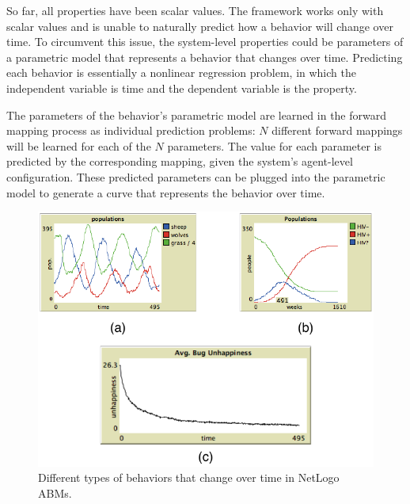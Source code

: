 So far, all properties have been scalar values.
The framework works only with scalar values and is unable to naturally predict how a behavior will change over time.
To circumvent this issue, the system-level properties could be parameters of a parametric model that represents a behavior that changes over time.
Predicting each behavior is essentially a nonlinear regression problem, in which the independent variable is time and the dependent variable is the property.

The parameters of the behavior's parametric model are learned in the forward mapping process as individual prediction problems: $N$ different forward mappings will be learned for each of the $N$ parameters.
The value for each parameter is predicted by the corresponding mapping, given the system's agent-level configuration.
These predicted parameters can be plugged into the parametric model to generate a curve that represents the behavior over time.

\begin{figure}[ht]
\centering
\includegraphics{images/overtime_compare.pdf}
\caption{Different types of behaviors that change over time in NetLogo ABMs. }
\label{fig:overtime_compare}
\end{figure}


